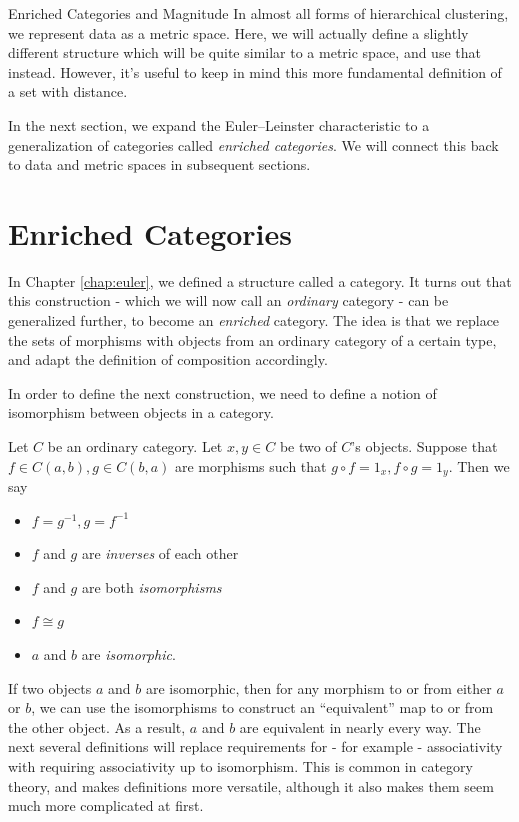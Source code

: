 \documentclass[12pt]{pom_thesis}
\begin{document}
\begin{chapter}{Enriched Categories and Magnitude}
In almost all forms of hierarchical clustering, we represent data as a metric space. Here, we will actually define a slightly different structure which will be quite similar to a metric space, and use that instead. However, it's useful to keep in mind this more fundamental definition of a set with distance.

In the next section, we expand the Euler--Leinster characteristic to a generalization of categories called \emph{enriched categories}. We will connect this back to data and metric spaces in subsequent sections.
\section{Enriched Categories}
In Chapter \ref{chap:euler}, we defined a structure called a category. It turns out that this construction - which we will now call an \emph{ordinary} category - can be generalized further, to become an \emph{enriched} category. The idea is that we replace the sets of morphisms with objects from an ordinary category of a certain type, and adapt the definition of composition accordingly. 

In order to define the next construction, we need to define a notion of isomorphism between objects in a category.
\begin{defn}
Let $C$ be an ordinary category. Let $x,y \in C$ be two of $C$'s objects. Suppose that $f \in C(a,b), g \in C(b,a)$ are morphisms such that $g \circ f = 1_x, f \circ g = 1_y$. Then we say
\begin{itemize}
\item $f = g^{-1}, g = f^{-1}$
\item $f$ and $g$ are \emph{inverses} of each other
\item $f$ and $g$ are both \emph{isomorphisms}
\item $f \cong g$
\item $a$ and $b$ are \emph{isomorphic}.
\end{itemize}
\end{defn}

If two objects $a$ and $b$ are isomorphic, then for any morphism to or from either $a$ or $b$, we can use the isomorphisms to construct an ``equivalent'' map to or from the other object. As a result, $a$ and $b$ are equivalent in nearly every way. The next several definitions will replace requirements for - for example - associativity with requiring associativity up to isomorphism. This is common in category theory, and makes definitions more versatile, although it also makes them seem much more complicated at first. 


\end{chapter}
\end{document}
